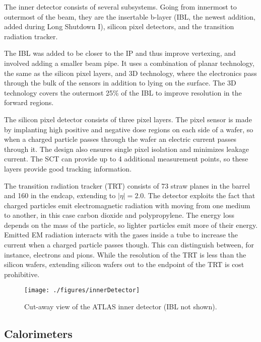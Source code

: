 The inner detector consists of several subsystems.  Going from innermost to outermost of the beam, they are the insertable b-layer (IBL, the newest addition, added during Long Shutdown I), silicon pixel detectors, and the transition radiation tracker.  

The IBL was added to be closer to the IP and thus improve vertexing, and involved adding a smaller beam pipe.  It uses a combination of planar technology, the same as the silicon pixel layers, and 3D technology, where the electronics pass through the bulk of the sensors in addition to lying on the surface.  The 3D technology covers the outermost 25\% of the IBL to improve resolution in the forward regions. %

The silicon pixel detector consists of three pixel layers.  The pixel sensor is made by implanting high positive and negative dose regions on each side of a wafer, so when a charged particle passes through the wafer an electric current passes through it.  The design also ensures single pixel isolation and minimizes leakage current.  The SCT can provide up to 4 additional measurement points, so these layers provide good tracking information.  %

The transition radiation tracker (TRT) consists of 73 straw planes in the barrel and 160 in the endcap, extending to $|\eta|=2.0$.  The detector exploits the fact that charged particles emit electromagnetic radiation with moving from one medium to another, in this case carbon dioxide and polypropylene.  The energy loss depends on the mass of the particle, so lighter particles emit more of their energy.  Emitted EM radiation interacts with the gases inside a tube to increase the current when a charged particle passes though.  This can distinguish between, for instance, electrons and pions.  While the resolution of the TRT is less than the silicon wafers, extending silicon wafers out to the endpoint of the TRT is cost prohibitive.  

\begin{figure}[h!]
  \centering
	\texttt{[image: ./figures/innerDetector]}
\caption{\label{fig:atlasCutAway}{ Cut-away view of the ATLAS inner detector (IBL not shown). }} %
\end{figure}

\subsection{Calorimeters} %

